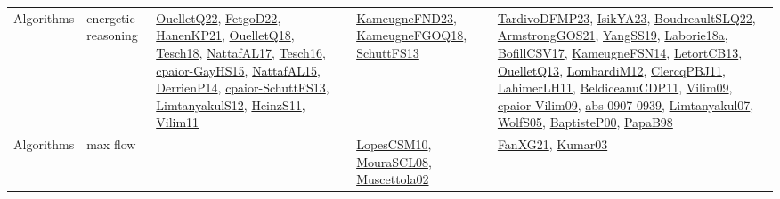 {\begin{longtable}{lp{3cm}>{\raggedright}p{6cm}>{\raggedright}p{6cm}p{8cm}}
Algorithms & energetic reasoning & \href{papers/OuelletQ22.pdf}{OuelletQ22}\cite{OuelletQ22}, \href{articles/FetgoD22.pdf}{FetgoD22}\cite{FetgoD22}, \href{papers/HanenKP21.pdf}{HanenKP21}\cite{HanenKP21}, \href{papers/OuelletQ18.pdf}{OuelletQ18}\cite{OuelletQ18}, \href{papers/Tesch18.pdf}{Tesch18}\cite{Tesch18}, \href{articles/NattafAL17.pdf}{NattafAL17}\cite{NattafAL17}, \href{papers/Tesch16.pdf}{Tesch16}\cite{Tesch16}, \href{papers/cpaior-GayHS15.pdf}{cpaior-GayHS15}\cite{cpaior-GayHS15}, \href{articles/NattafAL15.pdf}{NattafAL15}\cite{NattafAL15}, \href{papers/DerrienP14.pdf}{DerrienP14}\cite{DerrienP14}, \href{papers/cpaior-SchuttFS13.pdf}{cpaior-SchuttFS13}\cite{cpaior-SchuttFS13}, \href{articles/LimtanyakulS12.pdf}{LimtanyakulS12}\cite{LimtanyakulS12}, \href{papers/HeinzS11.pdf}{HeinzS11}\cite{HeinzS11}, \href{papers/Vilim11.pdf}{Vilim11}\cite{Vilim11} & \href{papers/KameugneFND23.pdf}{KameugneFND23}\cite{KameugneFND23}, \href{papers/KameugneFGOQ18.pdf}{KameugneFGOQ18}\cite{KameugneFGOQ18}, \href{papers/SchuttFS13.pdf}{SchuttFS13}\cite{SchuttFS13} & \href{papers/TardivoDFMP23.pdf}{TardivoDFMP23}\cite{TardivoDFMP23}, \href{articles/IsikYA23.pdf}{IsikYA23}\cite{IsikYA23}, \href{papers/BoudreaultSLQ22.pdf}{BoudreaultSLQ22}\cite{BoudreaultSLQ22}, \href{papers/ArmstrongGOS21.pdf}{ArmstrongGOS21}\cite{ArmstrongGOS21}, \href{papers/YangSS19.pdf}{YangSS19}\cite{YangSS19}, \href{papers/Laborie18a.pdf}{Laborie18a}\cite{Laborie18a}, \href{papers/BofillCSV17.pdf}{BofillCSV17}\cite{BofillCSV17}, \href{articles/KameugneFSN14.pdf}{KameugneFSN14}\cite{KameugneFSN14}, \href{papers/LetortCB13.pdf}{LetortCB13}\cite{LetortCB13}, \href{papers/OuelletQ13.pdf}{OuelletQ13}\cite{OuelletQ13}, \href{articles/LombardiM12.pdf}{LombardiM12}\cite{LombardiM12}, \href{papers/ClercqPBJ11.pdf}{ClercqPBJ11}\cite{ClercqPBJ11}, \href{papers/LahimerLH11.pdf}{LahimerLH11}\cite{LahimerLH11}, \href{articles/BeldiceanuCDP11.pdf}{BeldiceanuCDP11}\cite{BeldiceanuCDP11}, \href{papers/Vilim09.pdf}{Vilim09}\cite{Vilim09}, \href{papers/cpaior-Vilim09.pdf}{cpaior-Vilim09}\cite{cpaior-Vilim09}, \href{articles/abs-0907-0939.pdf}{abs-0907-0939}\cite{abs-0907-0939}, \href{papers/Limtanyakul07.pdf}{Limtanyakul07}\cite{Limtanyakul07}, \href{papers/WolfS05.pdf}{WolfS05}\cite{WolfS05}, \href{articles/BaptisteP00.pdf}{BaptisteP00}\cite{BaptisteP00}, \href{articles/PapaB98.pdf}{PapaB98}\cite{PapaB98}\\
Algorithms & max flow &  & \href{articles/LopesCSM10.pdf}{LopesCSM10}\cite{LopesCSM10}, \href{papers/MouraSCL08.pdf}{MouraSCL08}\cite{MouraSCL08}, \href{papers/Muscettola02.pdf}{Muscettola02}\cite{Muscettola02} & \href{articles/FanXG21.pdf}{FanXG21}\cite{FanXG21}, \href{papers/Kumar03.pdf}{Kumar03}\cite{Kumar03}\\

\end{longtable}}
